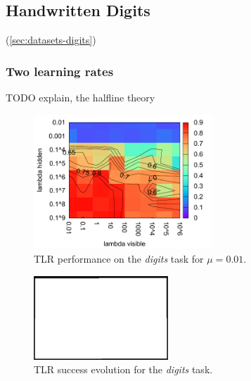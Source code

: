 

\subsection{Handwritten Digits} 
\label{sec:results-digits} 

(\ref{sec:datasets-digits}) 

\subsubsection{Two learning rates} 
\label{sec:tlr-digits} 

TODO explain, the halfline theory 

\begin{figure}[H]
  \centering
  \includegraphics[width=0.60\textwidth]{img/tlr-digits-psf.pdf} 
  \caption{TLR performance on the \emph{digits} task for $\mu = 0.01$.}
  \label{fig:results-tlr-digits-success}
\end{figure}

\begin{figure}[H]
  \centering
  \includegraphics[width=0.45\textwidth]{img/placeholder.png}  %
  \caption{TLR success evolution for the \emph{digits} task.}
  \label{fig:results-tlr-digits-epoch} 
\end{figure}

